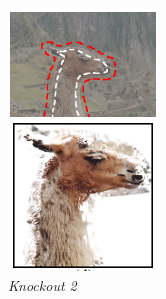 \begin{figure}[H]
\begin{subfigure}{0.3\textwidth}
      \includegraphics[width=\textwidth]{gambar/gambar-2_5(d).png}
      \caption{\emph{Knockout 2}}
    \end{subfigure}  
    \begin{subfigure}{0.3\textwidth}
      \centering{}

\end{subfigure}
\end{figure}
